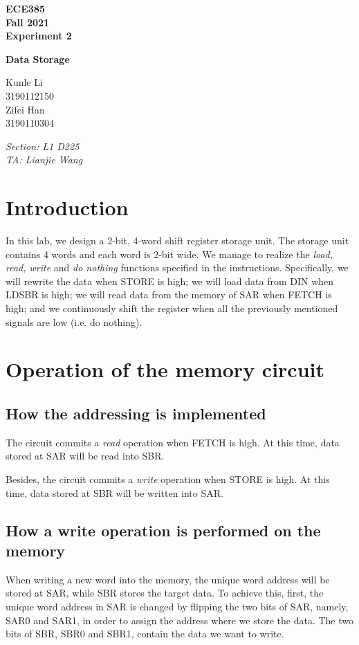 \documentclass[12pt]{article}
\begin{document}
\begin{titlepage}
    \centering
    {\Huge\bfseries ECE385\\\Large Fall 2021\\\Large Experiment 2}

    \vspace{1cm}
    
    {\LARGE\bfseries Data Storage}
    
    \vspace{2cm}
    
    {\Large Kunle Li\\3190112150\\Zifei Han\\3190110304}
    
    \vfill
    
    {\large\itshape Section: L1 D225\\TA: Lianjie Wang}
    \end{titlepage}

\section{Introduction}
In this lab, we design a 2-bit, 4-word shift register storage unit. The storage unit contains 4 words and each word is 2-bit wide. We manage to realize the \textit{load, read, write} and \textit{do nothing} functions specified in the instructions. Specifically, we will rewrite the data when STORE is high; we will load data from DIN when LDSBR is high; we will read data from the memory of SAR when FETCH is high; and we continuously shift the register when all the previously mentioned signals are low (i.e. do nothing).

\section{Operation of the memory circuit}
\subsection{How the addressing is implemented}
The circuit commits a \textit{read} operation when FETCH is high. At this time, data stored at SAR will be read into SBR.

Besides, the circuit commits a \textit{write} operation when STORE is high. At this time, data stored at SBR will be written into SAR.
\subsection{How a write operation is performed on the memory}
When writing a new word into the memory, the unique word address will be stored at SAR, while SBR stores the target data. To achieve this, first, the unique word address in SAR is changed by flipping the two bits of SAR, namely, SAR0 and SAR1, in order to assign the address where we store the data. The two bits of SBR, SBR0 and SBR1, contain the data we want to write. 
\end{document}
